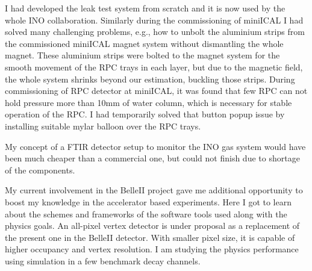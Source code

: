 \documentclass[12pt]{article}
\begin{document}
\begin{minipage}{1.05\textwidth}
\hspace{0.5cm}
I had developed the leak test system from scratch and it is now
used by the whole INO collaboration. Similarly during the
commissioning of miniICAL I had solved many challenging problems,
e.g., how to unbolt the aluminium strips from the commissioned
miniICAL magnet system without dismantling the whole magnet.
These aluminium strips were bolted to the
magnet system for the smooth movement of the RPC trays in each layer,
but due to the magnetic field, the whole system shrinks beyond our
estimation, buckling those strips.
During commissioning of RPC detector at miniICAL, it was found that
few RPC can not hold pressure more than 10mm of water column, which is
necessary for stable operation of the RPC. I had temporarily
solved that button popup issue by installing suitable mylar balloon
over the RPC trays.

\hspace{0.5cm}
My concept of a FTIR detector setup to
monitor the INO gas system would have been much cheaper than a
commercial one, but could not finish due to shortage of the components.


\hspace{0.5cm}
My current involvement in the BelleII project gave me additional
opportunity to boost my knowledge in the accelerator based experiments.
Here I got to learn about the schemes and frameworks of the software tools
used along with the physics goals.
An all-pixel vertex detector is under proposal as a replacement of
the present one in the BelleII detector. With smaller pixel size, it is
capable of higher occupancy and vertex resolution.
I am studying the physics performance using simulation in a
few benchmark decay channels.

\end{minipage}
\end{document}
